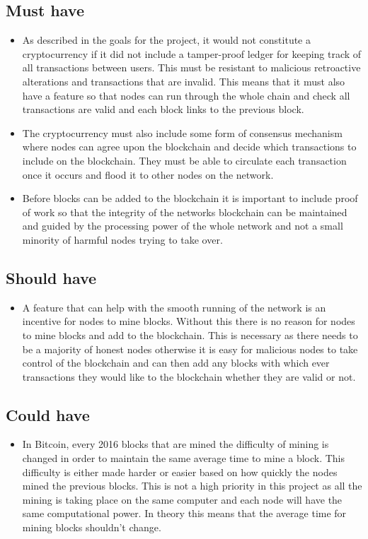 \documentclass{l4proj}
\begin{document}
\subsection{Must have}
\begin{itemize}
    \item As described in the goals for the project, it would not constitute a cryptocurrency if it did not include a tamper-proof
        ledger for keeping track of all transactions between users. This must be resistant to malicious retroactive alterations
        and transactions that are invalid. This means that it must also have a feature so that nodes can run through the 
        whole chain and check all transactions are valid and each block links to the previous block.

    \item The cryptocurrency must also include some form of consensus mechanism where nodes can agree upon the blockchain
        and decide which transactions to include on the blockchain. They must be able to circulate each transaction once
        it occurs and flood it to other nodes on the network.
    
    \item Before blocks can be added to the blockchain it is important to include proof of work so that the integrity of the 
        networks blockchain can be maintained and guided by the processing power of the whole network and not a small minority
        of harmful nodes trying to take over.
\end{itemize}

\subsection{Should have}
\begin{itemize}
    \item A feature that can help with the smooth running of the network is an incentive for nodes to mine blocks. Without this there
    is no reason for nodes to mine blocks and add to the blockchain. This is necessary as there needs to be a majority of 
    honest nodes otherwise it is easy for malicious nodes to take control of the blockchain and can then add any blocks with
    which ever transactions they would like to the blockchain whether they are valid or not.
\end{itemize}


\subsection{Could have}
\begin{itemize}
    \item In Bitcoin, every 2016 blocks that are mined the difficulty of mining is changed in order to maintain the same average time
    to mine a block. This difficulty is either made harder or easier based on how quickly the nodes mined the previous blocks.
    This is not a high priority in this project as all the mining is taking place on the same computer and each node will have
    the same computational power. In theory this means that the average time for mining blocks shouldn't change.
\end{itemize}
\end{document}
